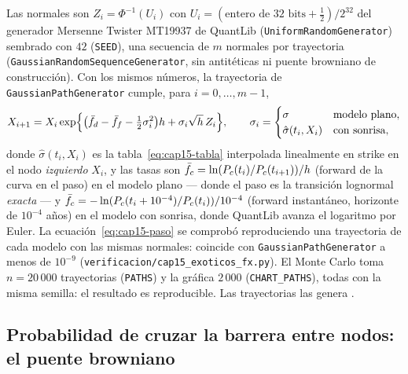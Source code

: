 Las normales son $Z_i=\Phi^{-1}(U_i)$ con $U_i=(\text{entero de 32 bits}+\tfrac12)/2^{32}$ del generador Mersenne Twister MT19937 de QuantLib
(\texttt{UniformRandomGenerator}) sembrado con $42$ (\texttt{SEED}), una secuencia de $m$ normales por trayectoria
(\texttt{GaussianRandomSequenceGenerator}, sin antitéticas ni puente browniano de construcción). Con los mismos números, la
trayectoria de \texttt{GaussianPathGenerator} cumple, para $i=0,\dots,m-1$,
\begin{equation}\label{eq:cap15-paso}
  X_{i+1}=X_i\exp\Bigl\{\bigl(\bar f_d-\bar f_f-\tfrac12\sigma_i^2\bigr)h+\sigma_i\sqrt h\,Z_i\Bigr\},\qquad
  \sigma_i=\begin{cases}\sigma &\text{modelo plano},\\ \hat\sigma(t_i,X_i)&\text{con sonrisa},\end{cases}
\end{equation}
donde $\hat\sigma(t_i,X_i)$ es la tabla~\eqref{eq:cap15-tabla} interpolada linealmente en strike en el nodo \emph{izquierdo} $X_i$, y las tasas son
$\bar f_c=\ln(P_{c}(t_i)/P_{c}(t_{i+1}))/h$ (forward de la curva en el paso) en el modelo plano --- donde el paso es la
transición lognormal \emph{exacta} --- y $\bar f_c=-\ln(P_{c}(t_i+10^{-4})/P_{c}(t_i))/10^{-4}$ (forward instantáneo, horizonte de $10^{-4}$ años) en el
modelo con sonrisa, donde QuantLib avanza el logaritmo por Euler. La ecuación~\eqref{eq:cap15-paso} se comprobó reproduciendo una trayectoria
de cada modelo con las mismas normales: coincide con \texttt{GaussianPathGenerator} a menos de $10^{-9}$
(\texttt{verificacion/cap15\_exoticos\_fx.py}). El Monte Carlo toma $n=20\,000$ trayectorias (\texttt{PATHS}) y la gráfica $2\,000$
(\texttt{CHART\_PATHS}), todas con la misma semilla: el resultado es reproducible. Las trayectorias las genera
.

\subsection{Probabilidad de cruzar la barrera entre nodos: el puente browniano}\label{sec:cap15-puente}

